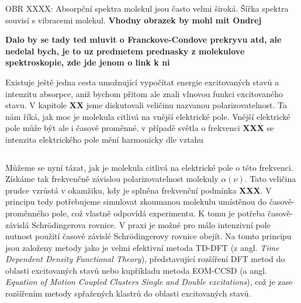 \bigskip
OBR XXXX: Absorpční spektra molekul jsou často velmi široká. Šířka spektra souvisí s vibracemi molekul. \textbf{Vhodny obrazek by mohl mit Ondrej}
\bigskip

\textbf{Dalo by se tady ted mluvit o Franckove-Condove prekryvu atd, ale nedelal bych, je to uz predmetem prednasky z molekulove spektroskopie, zde jde jenom o link k ni}


Existuje ještě jedna cesta umožnující vypočítat energie excitovaných stavů a intenzitu absorpce, aniž bychom přitom ale znali vlnovou funkci excitovaného stavu. V kapitole \textbf{XX} jsme diskutovali veličinu nazvanou polarizovatelnost. Ta nám říká, jak moc je molekula citlivá na vnější elektrické pole. Vnější elektrické pole může být ale i časově proměnné, v případě světla o frekvenci \textbf{XXX} se intenzita elektrického pole mění harmonicky dle vztahu

\begin{equation}
\label{rov:XXX}
\end{equation}

Můžeme se nyní tázat, jak je molekula citlivá na elektrické pole o této frekvenci. Získáme tak frekvenčně závislou polarizovatelnost molekuly $\alpha(\nu)$. Tato veličina prudce vzrůstá v okamžiku, kdy je splněna frekvenční podmínka \textbf{XXX}. V principu tedy potřebujeme simulovat zkoumanou molekulu umístěnou do časově-proměnného pole, což vlastně odpovídá experimentu. K tomu je potřeba časově-závislá Schr\"odingerova rovnice. V praxi je možné pro málo intenzivní pole nutnost použití časově závislé Schr\"odingerovy rovnice obejít. Na tomto principu jsou založeny metody jako je velmi efektivní metoda TD-DFT (z angl. \textit{Time Dependent Density Functional Theory}), představující rozšíření DFT metod do oblasti excitovaných stavů nebo kupříkladu metoda EOM-CCSD (a angl. \textit{Equation of Motion Coupled Clusters Single and Double excitations}), což je zase rozšířením metody spřažených klastrů do oblasti excitovaných stavů. 
   

 

           
      

   




 




      

      



